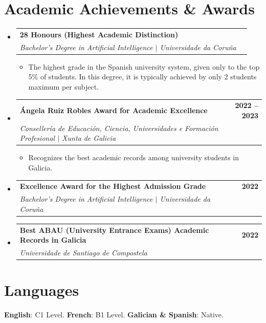 \documentclass[letterpaper,11pt]{article}
\makeatletter
\newcommand{\resumeItem}[1]{
  \item\small{#1}
}
\newcommand{\resumeSubheading}[4]{
  \item
    \begin{tabular*}{0.97\textwidth}[t]{@{}p{0.72\textwidth}@{\extracolsep{\fill}}r@{}}
      \textbf{#1} & \textbf{\small #2} \\
      \textit{\small #3} & \textit{\small #4} \\
    \end{tabular*}
  \vspace{2pt}
}
\newcommand{\resumeSubHeadingListStart}{\begin{itemize}[leftmargin=0.12in, label={}, itemsep=6pt, parsep=0pt, topsep=2pt]}
\newcommand{\resumeSubHeadingListEnd}{\end{itemize}}
\newcommand{\resumeItemListStart}{\begin{itemize}[leftmargin=0.15in, itemsep=2pt, parsep=0pt, topsep=2pt]}
\newcommand{\resumeItemListEnd}{\end{itemize}}
\makeatother
\begin{document}
\section{Academic Achievements \& Awards}
\resumeSubHeadingListStart
  \resumeSubheading
    {28 Honours (Highest Academic Distinction)}{}
    {Bachelor's Degree in Artificial Intelligence $|$ Universidade da Coru\~{n}a}{}
    \resumeItemListStart
      \resumeItem{The highest grade in the Spanish university system, given only to the top 5\% of students. In this degree, it is typically achieved by only 2 students maximum per subject.}
    \resumeItemListEnd
  \resumeSubheading
    {\'{A}ngela Ruiz Robles Award for Academic Excellence}{2022 -- 2023}
    {Conseller\'{i}a de Educaci\'{o}n, Ciencia, Universidades e Formaci\'{o}n Profesional $|$ Xunta de Galicia}{}
    \resumeItemListStart
      \resumeItem{Recognizes the best academic records among university students in Galicia.}
    \resumeItemListEnd
  \resumeSubheading
    {Excellence Award for the Highest Admission Grade}{2022}
    {Bachelor's Degree in Artificial Intelligence $|$ Universidade da Coru\~{n}a}{}
  \resumeSubheading
    {Best ABAU (University Entrance Exams) Academic Records in Galicia}{2022}
    {Universidade de Santiago de Compostela}{}
\resumeSubHeadingListEnd

\section{Languages}
\begin{itemize}[leftmargin=0.12in, label={}, itemsep=2pt, topsep=2pt]
  \small{\item{
    \textbf{English}{:} C1 Level. \quad
    \textbf{French}{:} B1 Level. \quad
    \textbf{Galician \& Spanish}{:} Native.
  }}
\end{itemize}
\end{document}
